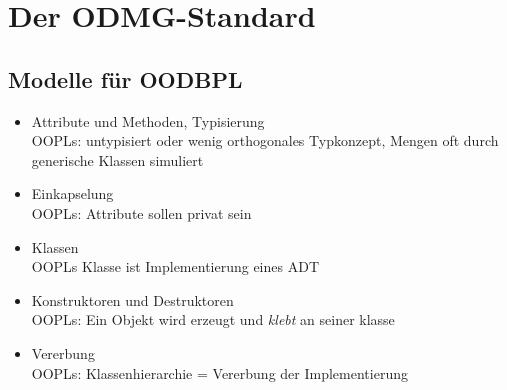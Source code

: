 \section{Der ODMG-Standard}
\subsection{Modelle für OODBPL}
\begin{itemize}
	\item Attribute und Methoden, Typisierung\\
	OOPLs: untypisiert oder wenig orthogonales Typkonzept, Mengen oft durch generische Klassen simuliert
	
	\item Einkapselung\\
	OOPLs: Attribute sollen privat sein
	
	\item Klassen\\
	OOPLs Klasse ist Implementierung eines ADT
	
	\item Konstruktoren und Destruktoren\\
	OOPLs: Ein Objekt wird erzeugt und \textit{klebt} an seiner klasse
	
	\item Vererbung\\
	OOPLs: Klassenhierarchie = Vererbung der Implementierung
\end{itemize}

